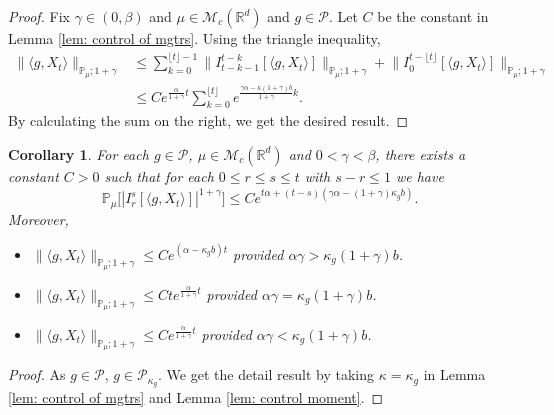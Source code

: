 \documentclass[12pt,oneside,english]{amsart}
\theoremstyle{plain}
\newtheorem{cor}[thm]{Corollary}
\theoremstyle{definition}
\numberwithin{equation}{section}
\newcommand{\added}[1]{{\color{blue}#1}}\newcommand{\deleted}[1]{{\color{red}#1}}
\begin{document}
\begin{proof}
    Fix $\gamma \in (0,\beta)$ and $\mu \in \mathcal M_c(\mathbb R^d)$ and $g\in \mathcal P$.
    Let $C$ be the constant in Lemma \ref{lem: control of mgtrs}.
    Using the triangle inequality,
\begin{align}
    \|\langle g,X_t\rangle\|_{\mathbb P_\mu;1+\gamma}
    &\leq \sum_{k=0}^{\lfloor t\rfloor - 1}\big\| I_{t-k-1}^{t-k}[\langle g,X_t\rangle] \big\|_{\mathbb P_\mu;1+\gamma}+\big\| I_{0}^{t-\lfloor t \rfloor}[\langle g,X_t\rangle]  \big\|_{\mathbb P_\mu;1+\gamma}
    \\ &\leq C e^{\frac{\alpha}{1+\gamma}t}\sum_{k=0}^{\lfloor t\rfloor} e^{\frac{\gamma\alpha-\kappa (1+\gamma)b}{1+\gamma} k} .
\end{align}
    By calculating the sum on the right, we get the desired result.
\end{proof}
\added{
\begin{cor}\label{cor: control of moment}
   For each $g\in\mathcal{P}$, $\mu \in \mathcal M_c(\mathbb{R}^d)$ and $0<\gamma < \beta$, there exists a constant $C>0$ such that for each $0\leq r\leq s\leq t$ with $s-r \leq 1$ we have
    \[
    \mathbb P_\mu\big[|I_r^s[\langle g, X_t\rangle]|^{1+\gamma}\big]
    \leq C e^{t\alpha+(t-s) (\gamma\alpha- (1+\gamma)\kappa_g b)}.
    \]
    Moreover,
    \begin{itemize}
    \item[(1)]
    $\|\langle g,X_t\rangle\|_{\mathbb{P}_{\mu};1+\gamma}\leq C e^{(\alpha-\kappa_g b)t}$ provided $\alpha\gamma > \kappa_g (1+\gamma)b$.
    \item[(2)]
    $\|\langle g,X_t\rangle\|_{\mathbb{P}_{\mu};1+\gamma}\leq C te^{\frac{\alpha}{1+\gamma}t}$ provided $\alpha\gamma = \kappa_g (1+\gamma)b$.
    \item[(3)]
    $\|\langle g,X_t\rangle\|_{\mathbb{P}_{\mu};1+\gamma}\leq C e^{\frac{\alpha}{1+\gamma}t}$ provided $\alpha\gamma < \kappa_g (1+\gamma)b$.
\end{itemize}
\end{cor}
\begin{proof}
    As $g\in\mathcal{P}$, $g\in\mathcal{P}_{\kappa_g}$. We get the detail result by taking $\kappa=\kappa_g$ in Lemma \ref{lem: control of mgtrs} and Lemma \ref{lem: control moment}.
\end{proof}
}
\end{document}
